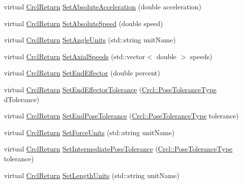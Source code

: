 \begin{DoxyCompactItemize}
virtual \hyperlink{namespaceCrcl_a1ed3b29723118a020251dde9b12733c0}{Crcl\-Return} \hyperlink{classCrcl_1_1CrclDelegateInterface_a723c774e71cac9c51fb8159d06e9ae1a}{Set\-Absolute\-Acceleration} (double acceleration)
\item 
virtual \hyperlink{namespaceCrcl_a1ed3b29723118a020251dde9b12733c0}{Crcl\-Return} \hyperlink{classCrcl_1_1CrclDelegateInterface_ad26647a78097ff9ee50e1abe285b7dbe}{Set\-Absolute\-Speed} (double speed)
\item 
virtual \hyperlink{namespaceCrcl_a1ed3b29723118a020251dde9b12733c0}{Crcl\-Return} \hyperlink{classCrcl_1_1CrclDelegateInterface_a08129b3f3681981b1d0e294a88674269}{Set\-Angle\-Units} (std\-::string unit\-Name)
\item 
virtual \hyperlink{namespaceCrcl_a1ed3b29723118a020251dde9b12733c0}{Crcl\-Return} \hyperlink{classCrcl_1_1CrclDelegateInterface_ae25f975824369ab1b82aa4c1b44c8754}{Set\-Axial\-Speeds} (std\-::vector$<$ double $>$ speeds)
\item 
virtual \hyperlink{namespaceCrcl_a1ed3b29723118a020251dde9b12733c0}{Crcl\-Return} \hyperlink{classCrcl_1_1CrclDelegateInterface_a3e49a7fb746c451704f6c55720f9caec}{Set\-End\-Effector} (double percent)
\item 
virtual \hyperlink{namespaceCrcl_a1ed3b29723118a020251dde9b12733c0}{Crcl\-Return} \hyperlink{classCrcl_1_1CrclDelegateInterface_a741f72f042107d75f97e225afb49eed0}{Set\-End\-Effector\-Tolerance} (\hyperlink{namespaceCrcl_ac805071e16341b82d4fa4e12b7f3ac6f}{Crcl\-::\-Pose\-Tolerance\-Type} d\-Tolerance)
\item 
virtual \hyperlink{namespaceCrcl_a1ed3b29723118a020251dde9b12733c0}{Crcl\-Return} \hyperlink{classCrcl_1_1CrclDelegateInterface_a96d2c6e58dbaa65eda19ae857853875b}{Set\-End\-Pose\-Tolerance} (\hyperlink{namespaceCrcl_ac805071e16341b82d4fa4e12b7f3ac6f}{Crcl\-::\-Pose\-Tolerance\-Type} tolerance)
\item 
virtual \hyperlink{namespaceCrcl_a1ed3b29723118a020251dde9b12733c0}{Crcl\-Return} \hyperlink{classCrcl_1_1CrclDelegateInterface_a6a9e07589fb159c1252f3a1964dab3c5}{Set\-Force\-Units} (std\-::string unit\-Name)
\item 
virtual \hyperlink{namespaceCrcl_a1ed3b29723118a020251dde9b12733c0}{Crcl\-Return} \hyperlink{classCrcl_1_1CrclDelegateInterface_a0bf311ad72c05dbdf43eb1d17a2f6458}{Set\-Intermediate\-Pose\-Tolerance} (\hyperlink{namespaceCrcl_ac805071e16341b82d4fa4e12b7f3ac6f}{Crcl\-::\-Pose\-Tolerance\-Type} tolerance)
\item 
virtual \hyperlink{namespaceCrcl_a1ed3b29723118a020251dde9b12733c0}{Crcl\-Return} \hyperlink{classCrcl_1_1CrclDelegateInterface_a8a3a26ceedee34111d177ecfa31bc978}{Set\-Length\-Units} (std\-::string unit\-Name)

\end{DoxyCompactItemize}
